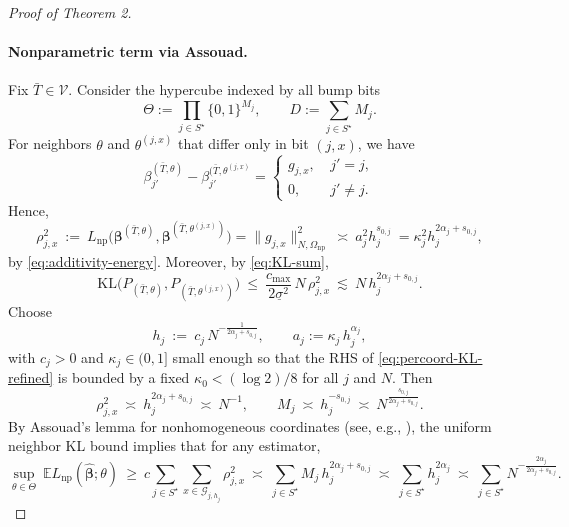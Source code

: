 \documentclass[11pt]{article}
\newcommand{\E}{\mathbb{E}} %
\theoremstyle{plain}
\theoremstyle{definition}
\theoremstyle{plain}
\begin{document}
\begin{proof}[Proof of Theorem 2]
\paragraph{Nonparametric term via Assouad.}
Fix $\bar T\in\mathcal V$. Consider the hypercube indexed by all bump bits
\[
\Theta:=\prod_{j\in S^\star}\{0,1\}^{M_j},
\qquad D:=\sum_{j\in S^\star}M_j.
\]
For neighbors $\theta$ and $\theta^{(j,x)}$ that differ only in bit $(j,x)$, we have \[
\beta_{j'} ^{(\bar{T},\theta)} - \beta_{j'} ^{(\bar{T},\theta^{(j,x)}} = \begin{cases}
    g_{j,x}, & \ j'=j, \\
    0, & \ j' \neq j.
\end{cases}
\]
Hence,
\begin{equation}\label{eq:percoord-sep-refined}
\rho_{j,x}^2\ :=\ L_{\mathrm{np}}\big(\bm\beta^{(\bar T,\theta)},\bm\beta^{(\bar T,\theta^{(j,x)})}\big)
=\| g_{j,x}\|_{N,\Omega_{\mathrm{np}}}^2
\ \asymp\ a_j^2 h_j^{s_{0,j}}
\ =  \kappa_j ^2 h_j^{2\alpha_j+s_{0,j}},
\end{equation}
by \eqref{eq:additivity-energy}. Moreover, by \eqref{eq:KL-sum},
\begin{equation}\label{eq:percoord-KL-refined}
\mathrm{KL}\big(P_{(\bar T,\theta)},P_{(\bar T,\theta^{(j,x)})}\big)
\ \le\ \frac{c_{\max}}{2\underline\sigma^2}\,N\,\rho_{j,x}^2
\ \lesssim\ N\,h_j^{2\alpha_j+s_{0,j}}.
\end{equation}
Choose
\begin{equation}\label{eq:hj-choice}
h_j \ :=\ c_j\,N^{-\frac{1}{2\alpha_j+s_{0,j}}},\qquad
a_j:=\kappa_j\,h_j^{\alpha_j},
\end{equation}
with $c_j>0$ and $\kappa_j\in(0,1]$ small enough so that the RHS of \eqref{eq:percoord-KL-refined} is bounded by a fixed $\kappa_0<(\log 2)/8$ for all $j$ and $N$. Then
\begin{equation}\label{eq:rho-square-final}
\rho_{j,x}^2\ \asymp\ h_j^{2\alpha_j+s_{0,j}}\ \asymp\ N^{-1},
\qquad
M_j\ \asymp\ h_j^{-s_{0,j}}\ \asymp\ N^{\frac{s_{0,j}}{2\alpha_j+s_{0,j}}}.
\end{equation}
By Assouad’s lemma for nonhomogeneous coordinates (see, e.g., \citealt[Th.\ 2.12]{Tsybakov2009}), the uniform neighbor KL bound implies that for any estimator,
\[
\sup_{\theta\in\Theta}\ \E L_{\mathrm{np}}(\widehat{\bm\beta};\theta)
\ \ge\ c\sum_{j\in S^\star}\sum_{x\in\mathcal G_{j,h_j}} \rho_{j,x}^2
\ \asymp\ \sum_{j\in S^\star} M_j\,h_j^{2\alpha_j+s_{0,j}}
\ \asymp\ \sum_{j\in S^\star} h_j^{2\alpha_j}
\ \asymp\ \sum_{j\in S^\star} N^{-\frac{2\alpha_j}{2\alpha_j+s_{0,j}}}.
\]
\end{proof}
\end{document}

